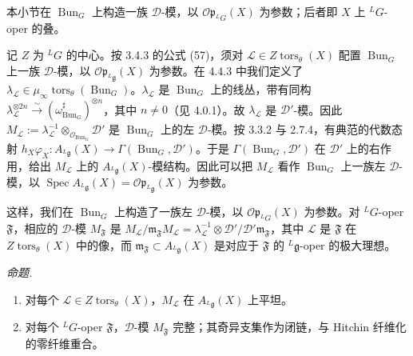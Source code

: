 

 本小节在 $\operatorname{Bun}_G$ 上构造一族 $\mathcal{D}$-模，以 $\mathcal{O}\mathfrak{p}_{{}^{L}G}(X)$ 为参数；后者即 $X$ 上 ${}^{L}G$-oper 的叠。

记 $Z$ 为 ${}^{L}G$ 的中心。按 3.4.3 的公式 (57)，须对 $\mathcal{L}\in Z\operatorname{tors}_\theta(X)$ 配置 $\operatorname{Bun}_G$ 上一族 $\mathcal{D}$-模，以 $\mathcal{O}\mathfrak{p}_{{}^{L}\mathfrak{g}}(X)$ 为参数。在 4.4.3 中我们定义了 $\lambda_{\mathcal{L}}\in\mu_\infty\operatorname{tors}_\theta(\operatorname{Bun}_G)$。$\lambda_{\mathcal{L}}$ 是 $\operatorname{Bun}_G$ 上的线丛，带有同构 $\lambda_{\mathcal{L}}^{\otimes 2n}\xrightarrow{\sim}(\omega^{\sharp}_{\operatorname{Bun}_G})^{\otimes n}$，其中 $n\ne 0$（见 4.0.1）。故 $\lambda_{\mathcal{L}}$ 是 $\mathcal{D}'$-模。因此 $M_{\mathcal{L}}:=\lambda_{\mathcal{L}}^{-1}\otimes_{\mathcal{O}_{\operatorname{Bun}_G}}\mathcal{D}'$ 是 $\operatorname{Bun}_G$ 上的左 $\mathcal{D}$-模。按 3.3.2 与 2.7.4，有典范的代数态射 $h_X\varphi_X:A_{{}^{L}\mathfrak{g}}(X)\to\Gamma(\operatorname{Bun}_G,\mathcal{D}')$。于是 $\Gamma(\operatorname{Bun}_G,\mathcal{D}')$ 在 $\mathcal{D}'$ 上的右作用，给出 $M_{\mathcal{L}}$ 上的 $A_{{}^{L}\mathfrak{g}}(X)$-模结构。因此可以把 $M_{\mathcal{L}}$ 看作 $\operatorname{Bun}_G$ 上一族左 $\mathcal{D}$-模，以 $\operatorname{Spec}A_{{}^{L}\mathfrak{g}}(X)=\mathcal{O}\mathfrak{p}_{{}^{L}\mathfrak{g}}(X)$ 为参数。

这样，我们在 $\operatorname{Bun}_G$ 上构造了一族左 $\mathcal{D}$-模，以 $\mathcal{O}\mathfrak{p}_{{}^{L}G}(X)$ 为参数。对 ${}^{L}G$-oper $\mathfrak{F}$，相应的 $\mathcal{D}$-模 $M_{\mathfrak{F}}$ 是 $M_{\mathcal{L}}/\mathfrak{m}_{\mathfrak{F}}M_{\mathcal{L}}=\lambda_{\mathcal{L}}^{-1}\otimes\mathcal{D}'/\mathcal{D}'\mathfrak{m}_{\mathfrak{F}}$，其中 $\mathcal{L}$ 是 $\mathfrak{F}$ 在 $Z\operatorname{tors}_\theta(X)$ 中的像，而 $\mathfrak{m}_{\mathfrak{F}}\subset A_{{}^{L}\mathfrak{g}}(X)$ 是对应于 $\mathfrak{F}$ 的 ${}^{L}\mathfrak{g}$-oper 的极大理想。

 \emph{命题.}
\begin{enumerate}[label=(\roman*),leftmargin=2.2em]
\item 对每个 $\mathcal{L}\in Z\operatorname{tors}_\theta(X)$，$M_{\mathcal{L}}$ 在 $A_{{}^{L}\mathfrak{g}}(X)$ 上平坦。
\item 对每个 ${}^{L}G$-oper $\mathfrak{F}$，$\mathcal{D}$-模 $M_{\mathfrak{F}}$ 完整；其奇异支集作为闭链，与 Hitchin 纤维化的零纤维重合。
\end{enumerate}

